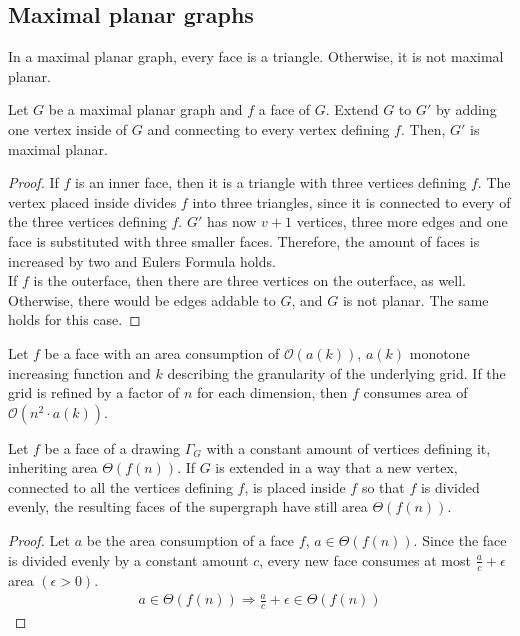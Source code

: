 \subsection*{Maximal planar graphs}
\begin{fact}\label{fact:maximal-triangle}
\end{fact}
In a maximal planar graph, every face is a triangle. Otherwise, it is not maximal planar.

\begin{fact}\label{fact:maximal-planar-supergraph}
\end{fact}
Let $G$ be a maximal planar graph and $f$ a face of $G$. Extend $G$ to $G'$ by adding one vertex inside of $G$ and connecting to every vertex defining $f$. Then, $G'$ is maximal planar.
\begin{proof}
	If $f$ is an inner face, then it is a triangle with three vertices defining $f$. The vertex placed inside divides $f$ into three triangles, since it is connected to every of the three vertices defining $f$. $G'$ has now $v+1$ vertices, three more edges and one face is substituted with three smaller faces. Therefore, the amount of faces is increased by two and Eulers Formula holds.\\
	If $f$ is the outerface, then there are three vertices on the outerface, as well. Otherwise, there would be edges addable to $G$, and $G$ is not planar. The same holds for this case. 
\end{proof}

\begin{fact}\label{fact:area-expansion}
\end{fact}
Let $f$ be a face with an area consumption of $\mathcal{O}(a(k))$, $a(k)$ monotone increasing function and $k$ describing the granularity of the underlying grid. If the grid is refined by a factor of $n$ for each dimension, then $f$ consumes area of $\mathcal{O}(n^2 \cdot a(k))$.

\begin{fact}\label{fact:even-subdivision}
\end{fact}
Let $f$ be a face of a drawing $\Gamma_G$ with a constant amount of vertices defining it, inheriting area $\Theta(f(n))$. If $G$ is extended in a way that a new vertex, connected to all the vertices defining $f$, is placed inside $f$ so that $f$ is divided evenly, the resulting faces of the supergraph have still area $\Theta(f(n))$.
\begin{proof}
	Let $a$ be the area consumption of a face $f$, $a \in \Theta(f(n))$. Since the face is divided evenly by a constant amount $c$, every new face consumes at most $\frac{a}{c}+\epsilon$ area $(\epsilon>0)$.
	\begin{align*}
		a \in \Theta(f(n)) \Rightarrow \frac{a}{c}+\epsilon \in \Theta(f(n))
	\end{align*}
\end{proof}

